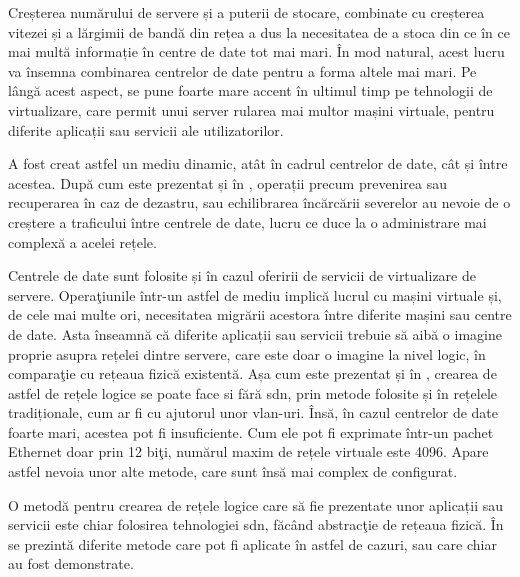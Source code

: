 Creșterea numărului de servere și a puterii de stocare, combinate cu creșterea vitezei și a lărgimii de bandă din rețea a dus la necesitatea de a stoca din ce în ce mai multă informație în centre de date tot mai mari. În mod natural, acest lucru va însemna combinarea centrelor de date pentru a forma altele mai mari. Pe lângă acest aspect, se pune foarte mare accent în ultimul timp pe tehnologii de virtualizare, care permit unui server rularea mai multor mașini virtuale, pentru diferite aplicații sau servicii ale utilizatorilor.

A fost creat astfel un mediu dinamic, atât în cadrul centrelor de date, cât și între acestea. După cum este prezentat și în \cite{onf_openflow_backbone2012}, operații precum prevenirea sau recuperarea în caz de dezastru, sau echilibrarea încărcării severelor au nevoie de o creștere a traficului între centrele de date, lucru ce duce la o administrare mai complexă a acelei rețele.

Centrele de date sunt folosite și în cazul oferirii de servicii de virtualizare de servere. Operaţiunile într-un astfel de mediu implică lucrul cu mașini virtuale și, de cele mai multe ori, necesitatea migrării acestora între diferite mașini sau centre de date. Asta înseamnă că diferite aplicații sau servicii trebuie să aibă o imagine proprie asupra rețelei dintre servere, care este doar o imagine la nivel logic, în comparaţie cu rețeaua fizică existentă. Așa cum este prezentat și în \cite{nadeau2013sdn}, crearea de astfel de rețele logice se poate face si fără \gls{sdn}, prin metode folosite și în rețelele tradiționale, cum ar fi cu ajutorul unor \gls{vlan}-uri. Însă, în cazul centrelor de date foarte mari, acestea pot fi insuficiente. Cum ele pot fi exprimate într-un pachet Ethernet doar prin 12 biţi, numărul maxim de rețele virtuale este 4096. Apare astfel nevoia unor alte metode, care sunt însă mai complex de configurat.

O metodă pentru crearea de rețele logice care să fie prezentate unor aplicații sau servicii este chiar folosirea tehnologiei \gls{sdn}, făcând abstracţie de rețeaua fizică. În \cite{onf_openflow_backbone2012, onf_sdn_datacenter2013, liu2014sdn, munoz2015integrated} se prezintă diferite metode care pot fi aplicate în astfel de cazuri, sau care chiar au fost demonstrate.

